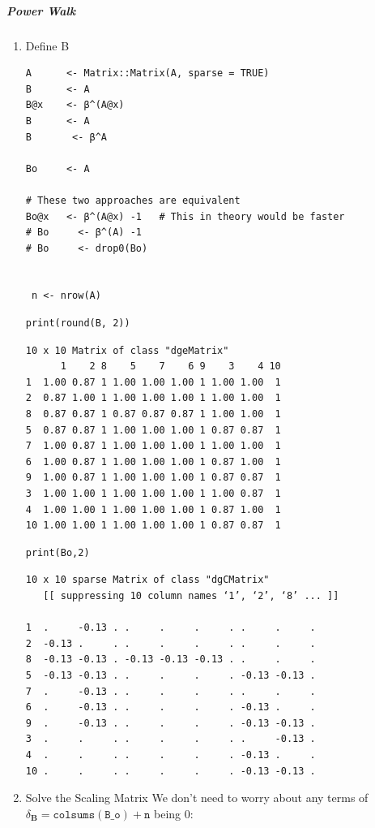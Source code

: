 \documentclass[11pt]{article}
\begin{document}
\subparagraph{Power Walk}
\label{sec:org4e03252}
\begin{enumerate}
\item Define B
\label{sec:orgde2e7a6}
\begin{verbatim}
A      <- Matrix::Matrix(A, sparse = TRUE)
B      <- A
B@x    <- β^(A@x)
B      <- A
B       <- β^A

Bo     <- A

# These two approaches are equivalent
Bo@x   <- β^(A@x) -1   # This in theory would be faster
# Bo     <- β^(A) -1
# Bo     <- drop0(Bo)


 n <- nrow(A)
\end{verbatim}

\begin{verbatim}
print(round(B, 2))
\end{verbatim}

\begin{verbatim}
10 x 10 Matrix of class "dgeMatrix"
      1    2 8    5    7    6 9    3    4 10
1  1.00 0.87 1 1.00 1.00 1.00 1 1.00 1.00  1
2  0.87 1.00 1 1.00 1.00 1.00 1 1.00 1.00  1
8  0.87 0.87 1 0.87 0.87 0.87 1 1.00 1.00  1
5  0.87 0.87 1 1.00 1.00 1.00 1 0.87 0.87  1
7  1.00 0.87 1 1.00 1.00 1.00 1 1.00 1.00  1
6  1.00 0.87 1 1.00 1.00 1.00 1 0.87 1.00  1
9  1.00 0.87 1 1.00 1.00 1.00 1 0.87 0.87  1
3  1.00 1.00 1 1.00 1.00 1.00 1 1.00 0.87  1
4  1.00 1.00 1 1.00 1.00 1.00 1 0.87 1.00  1
10 1.00 1.00 1 1.00 1.00 1.00 1 0.87 0.87  1
\end{verbatim}


\begin{verbatim}
print(Bo,2)
\end{verbatim}

\begin{verbatim}
10 x 10 sparse Matrix of class "dgCMatrix"
   [[ suppressing 10 column names ‘1’, ‘2’, ‘8’ ... ]]

1  .     -0.13 . .     .     .     . .     .     .
2  -0.13 .     . .     .     .     . .     .     .
8  -0.13 -0.13 . -0.13 -0.13 -0.13 . .     .     .
5  -0.13 -0.13 . .     .     .     . -0.13 -0.13 .
7  .     -0.13 . .     .     .     . .     .     .
6  .     -0.13 . .     .     .     . -0.13 .     .
9  .     -0.13 . .     .     .     . -0.13 -0.13 .
3  .     .     . .     .     .     . .     -0.13 .
4  .     .     . .     .     .     . -0.13 .     .
10 .     .     . .     .     .     . -0.13 -0.13 .
\end{verbatim}

\item Solve the Scaling Matrix
\label{sec:org91a6dae}
We don't need to worry about any terms of \(\delta_{\mathbf{B}} = \mathtt{colsums\left(B\_o\right)+n}\) being 0:


\end{enumerate}
\end{document}

